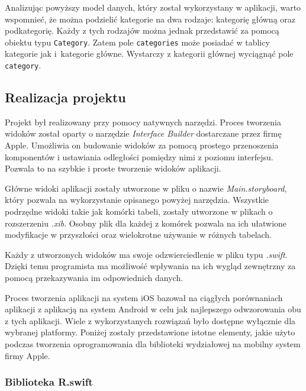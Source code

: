 \documentclass[twoside]{projektInzynierskiMS}
\begin{document}
Analizując powyższy model danych, który został wykorzystany w aplikacji, warto wspomnieć, że można podzielić kategorie na dwa rodzaje: kategorię główną oraz podkategorię. Każdy z tych rodzajów można jednak przedstawić za pomocą obiektu typu \verb`Category`. Zatem pole \verb`categories` może posiadać w tablicy kategorie jak i~kategorie główne. Wystarczy z kategorii głównej wyciągnąć pole \verb`category`.


\subsection{Realizacja projektu}

Projekt był realizowany przy pomocy natywnych narzędzi. Proces tworzenia widoków został oparty o narzędzie \textit{Interface Builder} dostarczane przez firmę Apple. Umożliwia on budowanie widoków za pomocą prostego przenoszenia komponentów i ustawiania odległości pomiędzy nimi z poziomu interfejsu. Pozwala to na szybkie i proste tworzenie widoków aplikacji.

Główne widoki aplikacji zostały utworzone w pliku o nazwie \textit{Main.storyboard}, który pozwala na wykorzystanie opisanego powyżej narzędzia. Wszystkie podrzędne widoki takie jak komórki tabeli, zostały utworzone w plikach o rozszerzeniu \textit{.xib}. Osobny plik dla każdej z komórek pozwala na ich ułatwione modyfikacje w przyszłości oraz wielokrotne używanie w różnych tabelach.

Każdy z utworzonych widoków ma swoje odzwierciedlenie w pliku typu \textit{.swift}. Dzięki temu programista ma możliwość wpływania na ich wygląd zewnętrzny za pomocą przekazywania im odpowiednich danych.

Proces tworzenia aplikacji na system iOS bazował na ciągłych porównaniach aplikacji z aplikacją na system Android w celu jak najlepszego odwzorowania obu z tych aplikacji. Wiele z wykorzystanych rozwiązań było dostępne wyłącznie dla wybranej platformy. Poniżej zostały przedstawione istotne elementy, jakie użyto podczas tworzenia oprogramowania dla biblioteki wydziałowej na mobilny system firmy Apple.


\subsubsection{Biblioteka R.swift}
\end{document}
